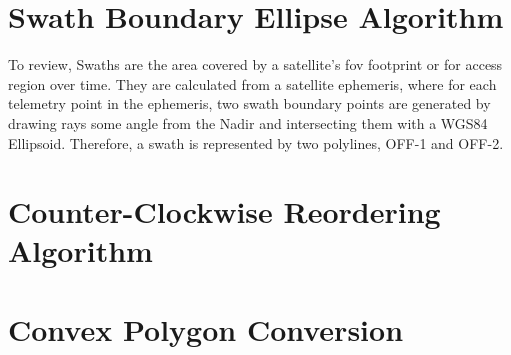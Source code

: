 
\section{Swath Boundary Ellipse Algorithm} \label{alg:ellipse}

To review, Swaths are the area covered by a satellite's \gls{fov} footprint or
\gls{for} access region over time. They are calculated from a satellite
ephemeris, where for each telemetry point in the ephemeris, two swath boundary
points are generated by drawing rays some angle from the Nadir and intersecting
them with a WGS84 Ellipsoid. Therefore, a swath is represented by two
polylines, OFF-1 and OFF-2. 



\section{Counter-Clockwise Reordering Algorithm} \label{alg:ccw}


\section{Convex Polygon Conversion} \label{alg:force-complex}

